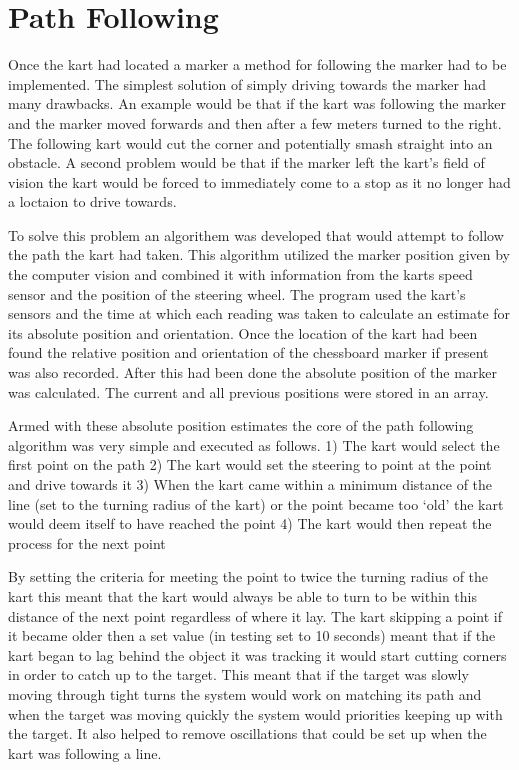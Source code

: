 \section{Path Following}
Once the kart had located a marker a method for following the marker had to be implemented. The simplest solution of simply driving towards the marker had many drawbacks. An example would be that if the kart was following the marker and the marker moved forwards and then after a few meters turned to the right. The following kart would cut the corner and potentially smash straight into an obstacle. A second problem would be that if the marker left the kart’s field of vision the kart would be forced to immediately come to a stop as it no longer had a loctaion to drive towards.

To solve this problem an algorithem was developed that would attempt to follow the path the kart had taken. This algorithm utilized the marker position given by the computer vision and combined it with information from the karts speed sensor and the position of the steering wheel. The program used the kart’s sensors and the time at which each reading was taken to calculate an estimate for its absolute position and orientation. Once the location of the kart had been found the relative position and orientation of the chessboard marker if present was also recorded. After this had been done the absolute position of the marker was calculated. The current and all previous positions were stored in an array.

Armed with these absolute position estimates the core of the path following algorithm was very simple and executed as follows. 
1) The kart would select the first point on the path
2) The kart would set the steering to point at the point and drive towards it
3) When the kart came within a minimum distance of the line (set to the turning radius of the kart)  or the point became too ‘old’ the kart would deem itself to have reached the point
4) The kart would then repeat the process for the next point

By setting the criteria for meeting the point to twice the turning radius of the kart this meant that the kart would always be able to turn to be within this distance  of the next point regardless of where it lay. The kart skipping a point if it became older then a set value (in testing set to 10 seconds) meant that if the kart began to lag behind the object it was tracking it would start cutting corners in order to catch up to the target. This meant that if the target was slowly moving through tight turns the system would work on matching its path and when the target was moving quickly the system would priorities keeping up with the target. It also helped to remove oscillations that could be set up when the kart was following a line.

